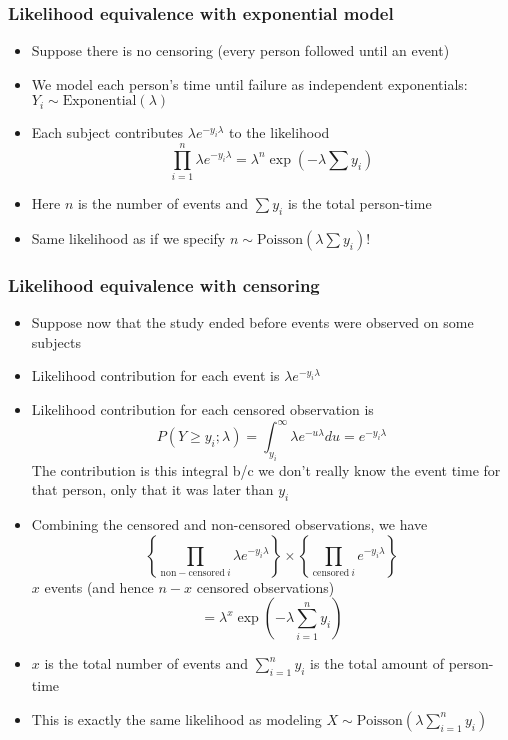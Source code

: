 \documentclass[aspectratio=169]{beamer}
\begin{document}
\begin{frame}\frametitle{Likelihood equivalence with exponential model}
\begin{itemize}
\item Suppose there is no censoring (every person followed until an event)
\item We model each person's time until failure as independent exponentials:
$Y_i \sim \mbox{Exponential}(\lambda)$
\item Each subject contributes $\lambda e^{-y_i \lambda}$ to the likelihood
  $$
  \prod_{i=1}^n \lambda e^{-y_i\lambda} = \lambda^n \exp\left(-\lambda\sum y_i\right)
  $$
\item Here $n$ is the number of events and $\sum y_i$ is the total person-time
\item Same likelihood as if we specify $n \sim \mbox{Poisson}(\lambda \sum y_i)$!
\end{itemize}

\end{frame}

\begin{frame}\frametitle{Likelihood equivalence with censoring}
\begin{itemize}
\item Suppose now that the study ended before events were observed on some subjects
\item Likelihood contribution for each event is $\lambda e^{-y_i \lambda}$
\item Likelihood contribution for each censored observation is 
  $$
  P(Y \geq y_i; \lambda) = \int_{y_i}^\infty \lambda e^{-u \lambda}du = e^{-y_i \lambda}
  $$
  The contribution is this integral b/c we don't really know the event time for that
  person, only that it was later than $y_i$
\end{itemize}
\end{frame}
 
\begin{frame}
\begin{itemize}
\item Combining the censored and non-censored observations, we have
$$
\left\{\prod_{\mathrm{non-censored} ~i}\lambda e^{-y_i \lambda}\right\}\times
\left\{\prod_{\mathrm{censored} ~i} e^{-y_i \lambda}\right\}
$$
$x$ events (and hence $n - x$ censored observations)
$$
= \lambda^x \exp\left(-\lambda \sum_{i=1}^n y_i\right)
$$
\item $x$ is the total number of events and $\sum_{i=1}^n y_i$ is the total amount of
  person-time
\item This is exactly the same likelihood as modeling $X \sim \mbox{Poisson}(\lambda \sum_{i=1}^n y_i)$
\end{itemize}
\end{frame}
\end{document}
